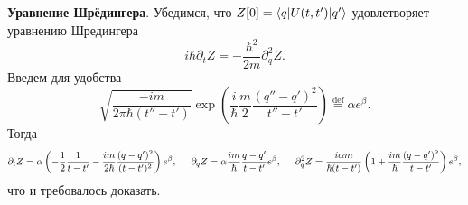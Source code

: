 \textbf{Уравнение Шрёдингера}. Убедимся, что $Z[0]=\bk{q}[U(t,t')]{q'}$ удовлетворяет уравнению Шредингера
\begin{equation*}
    i \hbar \partial_t Z = - \frac{\hbar^2}{2m} \partial_q^2 Z.
\end{equation*}
Введем для удобства
\begin{equation*}
    \sqrt{\frac{-i m}{2 \pi \hbar (t'' - t')}} \exp\left(
        \frac{i}{\hbar} \frac{m}{2} \frac{(q'' - q')^2}{t''-t'}
    \right) \overset{\mathrm{def}}{=}  \alpha e^{\beta}.
\end{equation*}
Тогда
\begin{align*}
    \partial_t Z = \alpha \left(- \frac{1}{2}\frac{1}{t-t'} - \frac{i m}{2 \hbar} \frac{(q-q')^2}{(t-t')^2} \right) e^\beta, 
    \hspace{5 mm} 
    \partial_q Z = \alpha \frac{i m}{\hbar} \frac{q-q'}{t-t'} e^\beta, 
    \hspace{5 mm} 
    \partial_q^2 Z = \frac{i \alpha m}{\hbar (t-t')} \left(
        1 + \frac{i m}{\hbar} \frac{(q-q')^2}{t-t'}
    \right)e^\beta,
\end{align*}
что и требовалось доказать.

